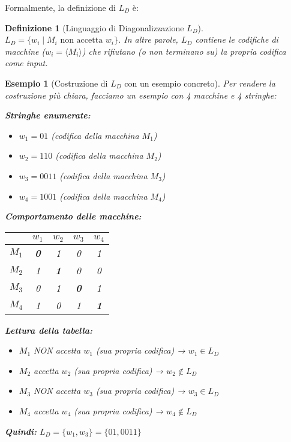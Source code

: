 \documentclass[a4paper]{article}
\newtheorem{definition}{Definizione}
\newtheorem{example}{Esempio}
\theoremstyle{remark} %
\begin{document}
Formalmente, la definizione di $L_D$ è:
\begin{definition}[Linguaggio di Diagonalizzazione $L_D$]
$L_D = \{ w_i \mid M_i \text{ non accetta } w_i \}$.
In altre parole, $L_D$ contiene le codifiche di macchine ($w_i = \langle M_i \rangle$) che rifiutano (o non terminano su) la propria codifica come input.
\end{definition}

\begin{example}[Costruzione di $L_D$ con un esempio concreto]
Per rendere la costruzione più chiara, facciamo un esempio con 4 macchine e 4 stringhe:

\textbf{Stringhe enumerate:}
\begin{itemize}
    \item $w_1 = 01$ (codifica della macchina $M_1$)
    \item $w_2 = 110$ (codifica della macchina $M_2$)
    \item $w_3 = 0011$ (codifica della macchina $M_3$)
    \item $w_4 = 1001$ (codifica della macchina $M_4$)
\end{itemize}

\textbf{Comportamento delle macchine:}
\begin{center}
\begin{tabular}{c|cccc}
 & $w_1$ & $w_2$ & $w_3$ & $w_4$ \\
\hline
$M_1$ & \textbf{0} & 1 & 0 & 1 \\
$M_2$ & 1 & \textbf{1} & 0 & 0 \\
$M_3$ & 0 & 1 & \textbf{0} & 1 \\
$M_4$ & 1 & 0 & 1 & \textbf{1} \\
\end{tabular}
\end{center}

\textbf{Lettura della tabella:}
\begin{itemize}
    \item $M_1$ NON accetta $w_1$ (sua propria codifica) → $w_1 \in L_D$
    \item $M_2$ accetta $w_2$ (sua propria codifica) → $w_2 \notin L_D$
    \item $M_3$ NON accetta $w_3$ (sua propria codifica) → $w_3 \in L_D$
    \item $M_4$ accetta $w_4$ (sua propria codifica) → $w_4 \notin L_D$
\end{itemize}

\textbf{Quindi:} $L_D = \{w_1, w_3\} = \{01, 0011\}$


\end{example}
\end{document}
